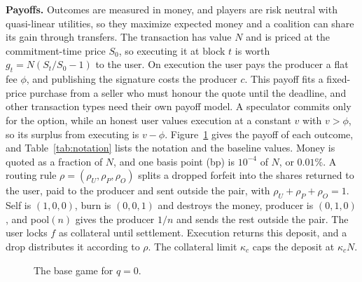 \documentclass[11pt]{article}
\begin{document}
\textbf{Payoffs.} Outcomes are measured in money, and players are risk neutral with quasi-linear utilities, so they maximize expected money and a coalition can share its gain through transfers. The transaction has value $N$ and is priced at the commitment-time price $S_0$, so executing it at block $t$ is worth $g_t=N(S_t/S_0-1)$ to the user. On execution the user pays the producer a flat fee $\phi$, and publishing the signature costs the producer $c$. This payoff fits a fixed-price purchase from a seller who must honour the quote until the deadline, and other transaction types need their own payoff model. A speculator commits only for the option, while an honest user values execution at a constant $v$ with $v>\phi$, so its surplus from executing is $v-\phi$. Figure~\ref{fig:tree} gives the payoff of each outcome, and Table~\ref{tab:notation} lists the notation and the baseline values. Money is quoted as a fraction of $N$, and one basis point (bp) is $10^{-4}$ of $N$, or $0.01\%$. A routing rule $\rho=(\rho_U,\rho_P,\rho_O)$ splits a dropped forfeit into the shares returned to the user, paid to the producer and sent outside the pair, with $\rho_U+\rho_P+\rho_O=1$. Self is $(1,0,0)$, burn is $(0,0,1)$ and destroys the money, producer is $(0,1,0)$, and pool$(n)$ gives the producer $1/n$ and sends the rest outside the pair. The user locks $f$ as collateral until settlement. Execution returns this deposit, and a drop distributes it according to $\rho$. The collateral limit $\kappa_c$ caps the deposit at $\kappa_c N$.

\begin{figure}[htbp]\centering
{}
\caption{The base game for $q=0$.}\label{fig:tree}
\end{figure}
\end{document}
